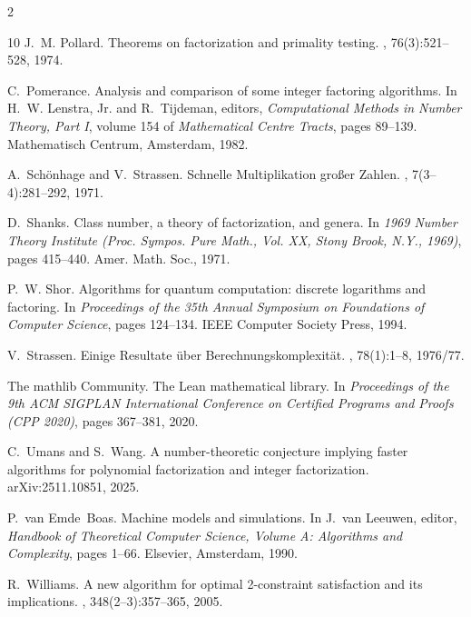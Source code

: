 \documentclass[11pt]{article}
\begin{document}
\begin{multicols}{2}
\begin{thebibliography}{10}
J.~M. Pollard.
\newblock Theorems on factorization and primality testing.
,
  76(3):521--528, 1974.

C.~Pomerance.
\newblock Analysis and comparison of some integer factoring algorithms.
\newblock In H.~W. Lenstra, Jr. and R.~Tijdeman, editors, {\em Computational
  Methods in Number Theory, Part I}, volume 154 of {\em Mathematical Centre
  Tracts}, pages 89--139. Mathematisch Centrum, Amsterdam, 1982.

A.~Sch{\"o}nhage and V.~Strassen.
\newblock Schnelle {M}ultiplikation gro{\ss}er {Z}ahlen.
, 7(3--4):281--292, 1971.

D.~Shanks.
\newblock Class number, a theory of factorization, and genera.
\newblock In {\em 1969 Number Theory Institute (Proc. Sympos. Pure Math., Vol.
  XX, Stony Brook, N.Y., 1969)}, pages 415--440. Amer. Math. Soc., 1971.

P.~W. Shor.
\newblock Algorithms for quantum computation: discrete logarithms and
  factoring.
\newblock In {\em Proceedings of the 35th Annual Symposium on Foundations of
  Computer Science}, pages 124--134. IEEE Computer Society Press, 1994.

V.~Strassen.
\newblock Einige {R}esultate {\"u}ber {B}erechnungskomplexit{\"a}t.
,
  78(1):1--8, 1976/77.

{The mathlib Community}.
\newblock The {L}ean mathematical library.
\newblock In {\em Proceedings of the 9th ACM SIGPLAN International Conference
  on Certified Programs and Proofs (CPP 2020)}, pages 367--381, 2020.

C.~Umans and S.~Wang.
\newblock A number-theoretic conjecture implying faster algorithms for
  polynomial factorization and integer factorization.
\newblock arXiv:2511.10851, 2025.

P.~van Emde~Boas.
\newblock Machine models and simulations.
\newblock In J.~van Leeuwen, editor, {\em Handbook of Theoretical Computer
  Science, Volume A: Algorithms and Complexity}, pages 1--66. Elsevier,
  Amsterdam, 1990.

R.~Williams.
\newblock A new algorithm for optimal 2-constraint satisfaction and its
  implications.
, 348(2--3):357--365, 2005.

\end{thebibliography}
\end{multicols}
\end{document}
